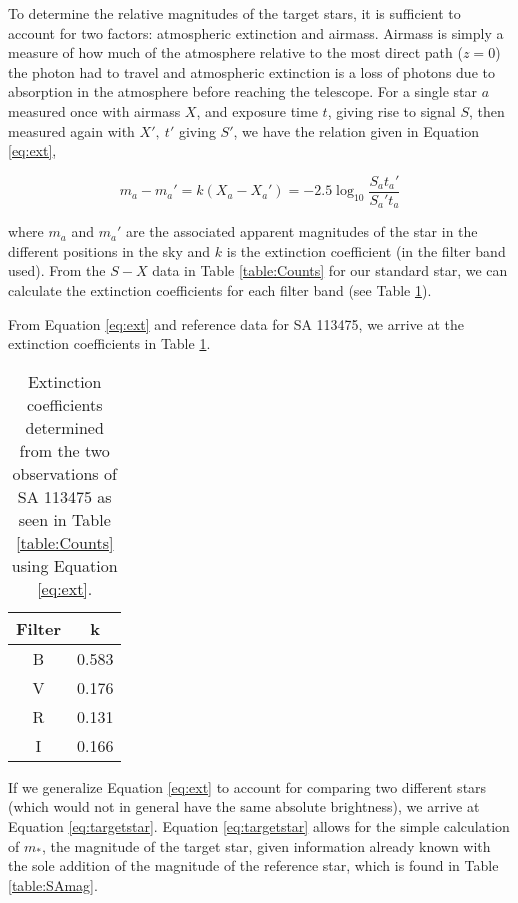 \documentclass{article}
\begin{document}
To determine the relative magnitudes of the target stars, it is sufficient to account for two factors: atmospheric extinction
and airmass. Airmass is simply a measure of how much of the atmosphere relative to the most direct path ($z=0$) the photon
had to travel and atmospheric extinction is a loss of photons due to absorption in the atmosphere before reaching the telescope.
For a single star $a$ measured once with airmass $X$, and exposure time $t$, giving rise to signal $S$, then measured again
with $X',~t'$ giving $S'$, we have the relation given in Equation \ref{eq:ext},

\begin{equation}
\label{eq:ext}
m_a-m_a'=k(X_a-X_a')=-2.5\log_{10}\frac{S_at_a'}{S_a't_a}
\end{equation}

where $m_a$ and $m_a'$ are the associated apparent magnitudes of the star in the different positions in the sky and $k$ is the
extinction coefficient (in the filter band used). From the $S-X$ data in Table \ref{table:Counts} for our standard star, we can
calculate the extinction coefficients for each filter band (see Table \ref{table:coeff}).

From Equation \ref{eq:ext} and reference data for SA 113475, we arrive at the extinction coefficients in Table \ref{table:coeff}.

\begin{table}
\begin{center}
\begin{tabular}{c | c}
Filter & k \\
\hline
B& 0.583\\
V&0.176\\
R& 0.131\\
I&0.166
\end{tabular}
\end{center}
\caption{Extinction coefficients determined from the two observations of SA 113475 as seen in Table \ref{table:Counts} using Equation \ref{eq:ext}.}
\label{table:coeff}
\end{table}

If we generalize Equation \ref{eq:ext} to account for comparing two different stars (which would not in general have the same absolute brightness),
we arrive at Equation \ref{eq:targetstar}. Equation \ref{eq:targetstar} allows for the simple calculation of $m_*$, the magnitude
of the target star, given information already known with the sole addition of the magnitude of the reference star, which is found in Table
\ref{table:SAmag}.
\end{document}
